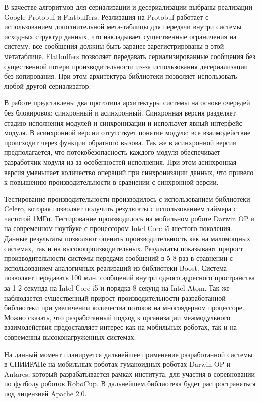 В качестве алгоритмов для сериализации и десериализации выбраны 
реализации Google Protobuf и Flatbuffers. Реализация на Protobuf 
работает с использованием дополнительной мета-таблицы для 
передачи внутри системы исходных структур данных, что 
накладывает существенные ограничения на систему: все сообщения 
должны быть заранее зарегистрированы в этой метатаблице. 
Flatbuffers позволяет передавать сериализированные сообщения без 
существенной потери производительности из-за использования 
десериализации без копирования. При этом архитектура библиотеки 
позволяет использовать любой другой сериализатор.

В работе представлены два прототипа архитектуры системы на 
основе очередей без блокировок: синхронный и асинхронный. 
Синхронная версия разделяет стадию исполнения модулей и 
синхронизации и использует явный интерфейс модуля. В асинхронной 
версии отсутствует понятие модуля: все взаимодействие происходит 
через функции обратного вызова. Так же в асинхронной версии 
предполагается, что потокобезопасность каждого модуля 
обеспечивает разработчик модуля из-за особенностей исполнения. 
При этом асинхронная версия уменьшает количество операций при 
синхронизации данных, что привело к повышению производительности 
в сравнении с синхронной версии.

Тестирование производительности производилось с использованием 
библиотеки Celero, которая позволяет получить результаты с 
использованием таймера с частотой 1МГц. Тестирование 
производилось на мобильном роботе Darwin OP и на современном 
ноутбуке с процессором Intel Core i5 шестого поколения. Данные 
результаты позволяют оценить производительность как на 
маломощных системах, так и на высокопроизводительных. Результаты 
показывают прирост производительности системы передачи сообщений 
в 5-8 раз в сравнении с использованием аналогичных реализаций из 
библиотеки Boost. Система позволяет передавать 100 млн. 
сообщений внутри одного адресного пространства за 1-2 секунда на 
Intel Core i5 и порядка 8 секунд на Intel Atom. Так же 
наблюдается существенный прирост производительности 
разработанной библиотеки при увеличении количества потоков на 
многоядерном процессоре. Можно сказать, что разработанный подход 
к организации межмодульного взаимодействия предоставляет интерес 
как на мобильных роботах, так и на современны высоконагруженных 
системах.

На данный момент планируется дальнейшее применение разработанной системы в СПИИРАНе на мобильных роботах гуманоидных роботах Darwin OP и Antares, который разрабатывается рамках института, для участия в соревновании по футболу роботов RoboCup. В дальнейшем библиотека будет распространяться под лицензией Apache 2.0.